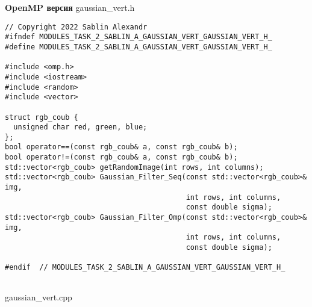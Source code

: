 \documentclass{report}
\begin{document}
\textbf{OpenMP версия}
\newline
\newline gaussian\_vert.h
\begin{lstlisting}
// Copyright 2022 Sablin Alexandr
#ifndef MODULES_TASK_2_SABLIN_A_GAUSSIAN_VERT_GAUSSIAN_VERT_H_
#define MODULES_TASK_2_SABLIN_A_GAUSSIAN_VERT_GAUSSIAN_VERT_H_

#include <omp.h>
#include <iostream>
#include <random>
#include <vector>

struct rgb_coub {
  unsigned char red, green, blue;
};
bool operator==(const rgb_coub& a, const rgb_coub& b);
bool operator!=(const rgb_coub& a, const rgb_coub& b);
std::vector<rgb_coub> getRandomImage(int rows, int columns);
std::vector<rgb_coub> Gaussian_Filter_Seq(const std::vector<rgb_coub>& img,
                                          int rows, int columns,
                                          const double sigma);
std::vector<rgb_coub> Gaussian_Filter_Omp(const std::vector<rgb_coub>& img,
                                          int rows, int columns,
                                          const double sigma);

#endif  // MODULES_TASK_2_SABLIN_A_GAUSSIAN_VERT_GAUSSIAN_VERT_H_


\end{lstlisting}
gaussian\_vert.cpp
\end{document}
